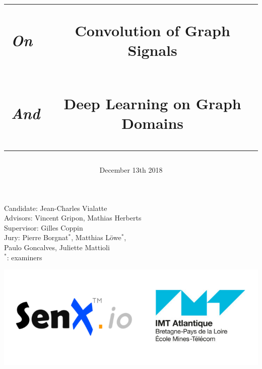 \documentclass[t,9pt,pdftex]{beamer}
\date{December 13th 2018}
\theoremstyle{definition}
\begin{document}

\begin{frame}[c, label=current]
\centering
\title{
\begin{tabular}{lc}
\begin{large}\emph{On}\end{large} & \begin{huge}Convolution of Graph Signals\end{huge}\\
\begin{large}\emph{And}\end{large} & \begin{huge}Deep Learning on Graph Domains\end{huge}
\end{tabular}
}
\vspace{0.2in}
\maketitle{}
\vspace{-1.3in}
\begin{multicols}{2}
{\small Candidate: Jean-Charles Vialatte\\
Advisors: Vincent Gripon, Mathias Herberts\\
Supervisor: Gilles Coppin\\
Jury: Pierre Borgnat$^*$, Matthias Löwe$^*$,\\Paulo Goncalves, Juliette Mattioli\\
$^*$: examiners}
\end{multicols}
\vspace{0.3in}
\centering\includegraphics[width=0.5\linewidth,height=\textheight,keepaspectratio]{logodouble.png}
\end{frame}

\end{document}
